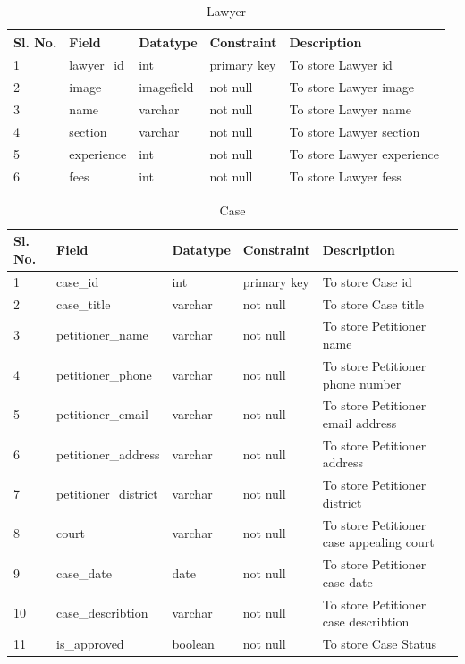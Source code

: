 \begin{table}[h]
   \centering
    \begin{tabular}{|l|l|l|l|l|}
    \hline 
    Sl. No.&  Field&  Datatype&  Constraint& Description \\
     \hline  
      1& lawyer\_id &int  &primary key  &To store Lawyer id \\ 
      \hline 
      2&image  &imagefield  &not null  &To store Lawyer image  \\
      \hline 
        3& name &varchar  &not null  &To store Lawyer name \\
   \hline 
        4& section &varchar  &not null  &To store Lawyer section \\
   \hline
        5& experience &int  &not null  &To store Lawyer experience \\
   \hline
        6& fees &int  &not null  &To store Lawyer fess \\
 
\hline
    \end{tabular}
\caption{Lawyer}
\label{tab:Lawyer}
\end{table}
\begin{table}[h]
   \centering
    \begin{tabular}{|l|l|l|l|l|}
    \hline 
    Sl. No.&  Field&  Datatype&  Constraint& Description \\
     \hline  
      1& case\_id &int  &primary key  &To store Case id \\ 
      \hline 
      2&case\_title  &varchar  &not null  &To store Case title  \\
      \hline 
        3& petitioner\_name &varchar  &not null  &To store Petitioner name \\
   \hline 
        4& petitioner\_phone &varchar  &not null  &To store Petitioner phone number \\
   \hline
        5& petitioner\_email &varchar  &not null  &To store Petitioner email address \\
   \hline
        6& petitioner\_address &varchar  &not null  &To store Petitioner  address \\
   \hline
        7& petitioner\_district &varchar  &not null  &To store Petitioner  district \\
   \hline
        8& court &varchar  &not null  &To store Petitioner case appealing court \\
   \hline
        9& case\_date &date  &not null  &To store Petitioner case date \\
   \hline
        10& case\_describtion &varchar  &not null  &To store Petitioner case describtion \\
   \hline
        11& is\_approved &boolean  &not null  &To store Case Status \\

\hline
    \end{tabular}
\caption{Case}
\label{tab:Case}
\end{table}


